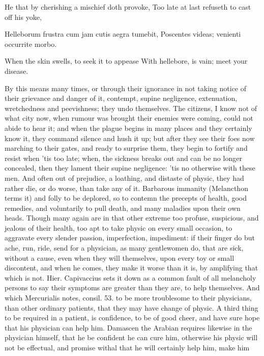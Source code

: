 {He that by cherishing a mischief doth provoke,
Too late at last refuseth to cast off his yoke,

Helleborum frustra cum jam cutis aegra tumebit,
Poscentes videas; venienti occurrite morbo.

When the skin swells, to seek it to appease
With hellebore, is vain; meet your disease.

By this means many times, or through their ignorance in not taking
notice of their grievance and danger of it, contempt, supine
negligence, extenuation, wretchedness and peevishness; they undo
themselves. The citizens, I know not of what city now, when rumour was
brought their enemies were coming, could not abide to hear it; and when
the plague begins in many places and they certainly know it, they
command silence and hush it up; but after they see their foes now
marching to their gates, and ready to surprise them, they begin to
fortify and resist when 'tis too late; when, the sickness breaks out
and can be no longer concealed, then they lament their supine
negligence: 'tis no otherwise with these men. And often out of
prejudice, a loathing, and distaste of physic, they had rather die, or
do worse, than take any of it. Barbarous immanity (Melancthon
terms it) and folly to be deplored, so to contemn the precepts of
health, good remedies, and voluntarily to pull death, and many maladies
upon their own heads. Though many again are in that other extreme too
profuse, suspicious, and jealous of their health, too apt to take
physic on every small occasion, to aggravate every slender passion,
imperfection, impediment: if their finger do but ache, run, ride, send
for a physician, as many gentlewomen do, that are sick, without a
cause, even when they will themselves, upon every toy or small
discontent, and when he comes, they make it worse than it is, by
amplifying that which is not. Hier. Capivaccius sets it down as a
common fault of all melancholy persons to say their symptoms are
greater than they are, to help themselves. And which Mercurialis
notes, consil. 53. to be more troublesome to their physicians, than
other ordinary patients, that they may have change of physic.
A third thing to be required in a patient, is confidence, to be of good
cheer, and have sure hope that his physician can help him.
Damascen the Arabian requires likewise in the physician himself,
that he be confident he can cure him, otherwise his physic will not be
effectual, and promise withal that he will certainly help him, make him
}
